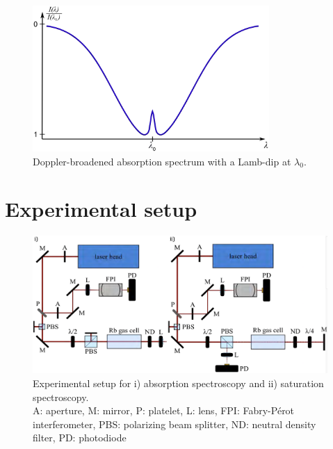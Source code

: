 \begin{figure}[h]
    \centering
    \includegraphics[width=9cm]{Lamb.png}
    \caption{Doppler-broadened absorption spectrum with a Lamb-dip at $\lambda_{0}$.}
    \label{fig:Lamb}
\end{figure}

\chapter{Experimental setup}

\begin{figure}[h]
    \centering
    \includegraphics[width=15.8cm]{Expset.png}
    \caption{Experimental setup for i) absorption spectroscopy and ii) saturation spectroscopy.\\ A: aperture, M: mirror, P: platelet, L: lens, FPI: Fabry-Pérot interferometer, PBS: polarizing beam splitter, ND: neutral density filter, PD: photodiode}
    \label{fig:Expset}
\end{figure}

